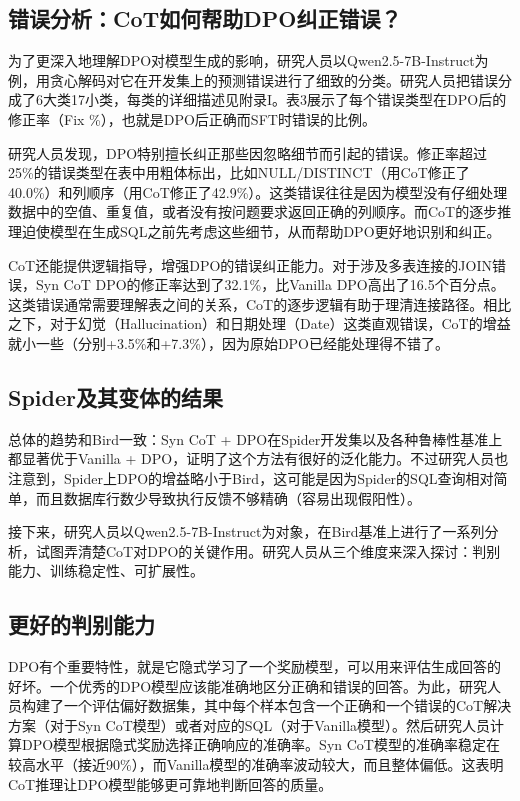 \subsection{错误分析：CoT如何帮助DPO纠正错误？}
为了更深入地理解DPO对模型生成的影响，研究人员以Qwen2.5-7B-Instruct为例，用贪心解码对它在开发集上的预测错误进行了细致的分类。研究人员把错误分成了6大类17小类，每类的详细描述见附录I。表3展示了每个错误类型在DPO后的修正率（Fix \%），也就是DPO后正确而SFT时错误的比例。

研究人员发现，DPO特别擅长纠正那些因忽略细节而引起的错误。修正率超过25\%的错误类型在表中用粗体标出，比如NULL/DISTINCT（用CoT修正了40.0\%）和列顺序（用CoT修正了42.9\%）。这类错误往往是因为模型没有仔细处理数据中的空值、重复值，或者没有按问题要求返回正确的列顺序。而CoT的逐步推理迫使模型在生成SQL之前先考虑这些细节，从而帮助DPO更好地识别和纠正。

CoT还能提供逻辑指导，增强DPO的错误纠正能力。对于涉及多表连接的JOIN错误，Syn CoT DPO的修正率达到了32.1\%，比Vanilla DPO高出了16.5个百分点。这类错误通常需要理解表之间的关系，CoT的逐步逻辑有助于理清连接路径。相比之下，对于幻觉（Hallucination）和日期处理（Date）这类直观错误，CoT的增益就小一些（分别+3.5\%和+7.3\%），因为原始DPO已经能处理得不错了。

\subsection{Spider及其变体的结果}
总体的趋势和Bird一致：Syn CoT + DPO在Spider开发集以及各种鲁棒性基准上都显著优于Vanilla + DPO，证明了这个方法有很好的泛化能力。不过研究人员也注意到，Spider上DPO的增益略小于Bird，这可能是因为Spider的SQL查询相对简单，而且数据库行数少导致执行反馈不够精确（容易出现假阳性）。

接下来，研究人员以Qwen2.5-7B-Instruct为对象，在Bird基准上进行了一系列分析，试图弄清楚CoT对DPO的关键作用。研究人员从三个维度来深入探讨：判别能力、训练稳定性、可扩展性。

\subsection{更好的判别能力}
DPO有个重要特性，就是它隐式学习了一个奖励模型，可以用来评估生成回答的好坏。一个优秀的DPO模型应该能准确地区分正确和错误的回答。为此，研究人员构建了一个评估偏好数据集，其中每个样本包含一个正确和一个错误的CoT解决方案（对于Syn CoT模型）或者对应的SQL（对于Vanilla模型）。然后研究人员计算DPO模型根据隐式奖励选择正确响应的准确率。Syn CoT模型的准确率稳定在较高水平（接近90\%），而Vanilla模型的准确率波动较大，而且整体偏低。这表明CoT推理让DPO模型能够更可靠地判断回答的质量。

